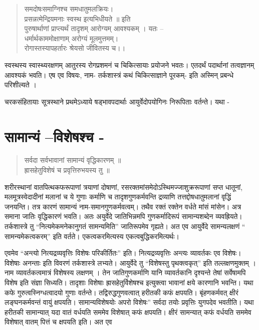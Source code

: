 {\begin{verse}
समदोषःसमाग्निश्च समधातुमलक्रियः।\\
प्रसन्नत्मेन्द्रियमनाः स्वस्थ इत्यभिधीयते ॥ इति\\
पुरुषार्थाणां प्राप्त्यर्थं तादृशम् आरोग्यम् आवश्यकम् । यतः –\\
धर्मार्थकाममोक्षाणाम् अरोग्यं मूलमुत्तमम्।\\
रोगास्तस्यापहर्तारः श्रेयसो जीवितस्य च।।
\end{verse}
स्वस्थस्य स्वास्थ्यरक्षणम् आतुरस्य रोगप्रशमनं च चिकित्सायाः प्रयोजने भवतः। एतदर्थं पदार्थानां तत्वज्ञानम् आवश्यकं भवति। एष एव विषयः, नाम- तर्कशास्त्रं कथं चिकित्साज्ञाने पूरकम्- इति अस्मिन् प्रबन्धे परिशील्यते ।

चरकसंहितायाः सूत्रस्थाने प्रथमेऽध्याये षड्भावपदार्थाः आयुर्वेदोपयोगिनः निरूपिताः वर्तन्ते। यथा -

\section*{सामान्यं –विशेषश्च -}

\begin{verse}
सर्वदा सर्वभावानां सामान्यं वृद्धिकारणम् ॥\\
ह्रासहेतुविशेषं च प्रवृत्तिरुभयस्य तु ॥
\end{verse}

शरीरस्थानां वातपित्थकफरूपाणां त्रयाणां दोषाणां, रसरक्तमांसमेदोऽस्थिमज्जाशुक्ररूपाणां सप्त धातूनां, मलमूत्रस्वेदादीनां मलानां च ये गुणाः कर्माणि च तादृशगुणकर्मवन्ति द्रव्याणि तत्तद्दोषधातुमलानां वृद्धिं जनयन्ति। तत्र कारणं सामान्यं नाम-समानगुणकर्मवत्वम्। तथैव रक्तं रक्तेन वर्धते मांसं मांसेन। अत्र समाना जातिः वृद्धिकारणं भवति। अतः अयुर्वेदे जातिभिन्नमपि गुणकर्मादिरूपं सामान्यशब्देन व्यवह्रियते। तर्कशास्त्रे तु “नित्यमेकमनेकानुगतं सामन्यमिति” जातिरूपमेव गृह्यते। अत एव आयुर्वेदे सामन्यलक्षणं “ सामन्यमेकत्वकरम्” इति वर्तते। एकत्वकरमित्यस्य एकत्वबुद्धिकरमित्यर्थः।

एवमेव “अन्त्यो नित्यद्रव्यवृत्तिः विशेषः परिकीर्तितः” इति। नित्यद्रव्यवृत्तिः अन्त्यः व्यावर्तकः एव विशेषः। विशेषाः अनन्ताः इति विवरणं तर्कशास्त्रे लभ्यते। आयुर्वेदे तु “विशेषस्तु पृथक्त्वकृत्” इति तल्लक्षणमुक्तम् । नाम व्यावर्तकत्वमात्रं विशेषस्य लक्षणम् । तेन जातिगुणकर्माणि यानि व्यावर्तकानि दृश्यन्ते तेषां सर्वेषामपि विशेष इति संज्ञा सिध्यति। तादृशाः विशेषाः ह्रासहेतुर्विशेषश्च इत्युक्त्वा भावानां क्षये कारणानि भवन्ति। यथा कफे गुरुत्वस्निग्धत्वादयो गुणाः वर्तन्ते। तद्विरुद्धगुणवत्वात् हरीतकी कफं क्षपयति। बृंहणकर्मवत् क्षीरं लङ्घनकर्मवन्तं वायुं क्षपयति। सामान्यविशेषयोः अपरो विशेषः” सर्वदा तयोः प्रवृत्तिः युगपदेव भवतीति। यथा हरीतकी सामान्यात् यदा वातं वर्धयति सममेव विशेषात् कफं क्षपयति। क्षीरं सामन्यात् कफं वर्धयति सममेव विशेषात् वातम् पित्तं च क्षपयति इति। अत एव

}

